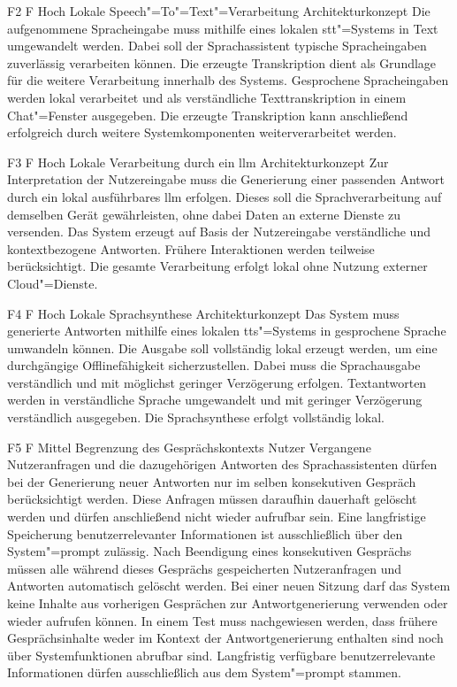 \snowcard
{F2}
{F}
{Hoch}
{Lokale Speech"=To"=Text"=Verarbeitung}
{Architekturkonzept}
{}
{Die aufgenommene Spracheingabe muss mithilfe eines lokalen \gls{stt}"=Systems in Text umgewandelt werden. Dabei soll der Sprachassistent typische Spracheingaben zuverlässig verarbeiten können. Die erzeugte Transkription dient als Grundlage für die weitere Verarbeitung innerhalb des Systems.}
{Gesprochene Spracheingaben werden lokal verarbeitet und als verständliche Texttranskription in einem Chat"=Fenster ausgegeben. Die erzeugte Transkription kann anschließend erfolgreich durch weitere Systemkomponenten weiterverarbeitet werden.}
{}
\clearpage

\snowcard
{F3}
{F}
{Hoch}
{Lokale Verarbeitung durch ein \gls{llm}}
{Architekturkonzept}
{}
{Zur Interpretation der Nutzereingabe muss die Generierung einer passenden Antwort durch ein lokal ausführbares \gls{llm} erfolgen. Dieses soll die Sprachverarbeitung auf demselben Gerät gewährleisten, ohne dabei Daten an externe Dienste zu versenden. }
{Das System erzeugt auf Basis der Nutzereingabe verständliche und kontextbezogene Antworten. Frühere Interaktionen werden teilweise berücksichtigt. Die gesamte Verarbeitung erfolgt lokal ohne Nutzung externer Cloud"=Dienste.}
{}

\snowcard
{F4}
{F}
{Hoch}
{Lokale Sprachsynthese}
{Architekturkonzept}
{}
{Das System muss generierte Antworten mithilfe eines lokalen \gls{tts}"=Systems in gesprochene Sprache umwandeln können. Die Ausgabe soll vollständig lokal erzeugt werden, um eine durchgängige Offlinefähigkeit sicherzustellen. Dabei muss die Sprachausgabe verständlich und mit möglichst geringer Verzögerung erfolgen.}
{Textantworten werden in verständliche Sprache umgewandelt und mit geringer Verzögerung verständlich ausgegeben. Die Sprachsynthese erfolgt vollständig lokal.}
{}
\clearpage

\snowcard
{F5}
{F}
{Mittel}
{Begrenzung des Gesprächskontexts}
{Nutzer}
{}
{Vergangene Nutzeranfragen und die dazugehörigen Antworten des Sprachassistenten dürfen bei der Generierung neuer Antworten nur im selben konsekutiven Gespräch berücksichtigt werden. Diese Anfragen müssen daraufhin dauerhaft gelöscht werden und dürfen anschließend nicht wieder aufrufbar sein. Eine langfristige Speicherung benutzerrelevanter Informationen ist ausschließlich über den System"=prompt zulässig.}
{Nach Beendigung eines konsekutiven Gesprächs müssen alle während dieses Gesprächs gespeicherten Nutzeranfragen und Antworten automatisch gelöscht werden. Bei einer neuen Sitzung darf das System keine Inhalte aus vorherigen Gesprächen zur Antwortgenerierung verwenden oder wieder aufrufen können. In einem Test muss nachgewiesen werden, dass frühere Gesprächsinhalte weder im Kontext der Antwortgenerierung enthalten sind noch über Systemfunktionen abrufbar sind. Langfristig verfügbare benutzerrelevante Informationen dürfen ausschließlich aus dem System"=prompt stammen.}
{}

